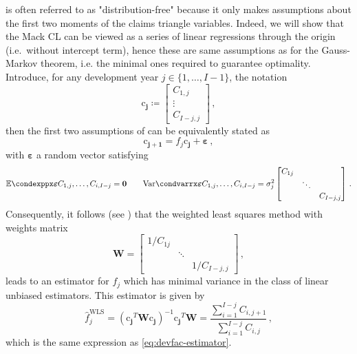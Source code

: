 \documentclass[a4paper]{book}
\begin{document}
 is often referred to as "distribution-free" because it only makes assumptions about the first two moments of the claims triangle variables. Indeed, we will show that the Mack CL can be viewed as a series of linear regressions through the origin (i.e.\ without intercept term), hence these are same assumptions as for the Gauss-Markov theorem, i.e. the minimal ones required to guarantee optimality. Introduce, for any development year $j \in \{ 1, \dots, {I - 1} \}$, the notation
\begin{equation}
  \bm{\mathrm{c}_j} \coloneqq
  \begin{bmatrix}
    C_{1, j} \\
    \vdots \\
    C_{I - j, j}
  \end{bmatrix} \,,
\end{equation}
then the first two assumptions of  can be equivalently stated as
\begin{equation}
  \bm{\mathrm{c}_{j + 1}} = f_j \bm{\mathrm{c}_j} + \bm{\varepsilon} \,,
\end{equation}
with $\bm{\varepsilon}$ a random vector satisfying
\begin{equation}
  \condexpp{\bm{\varepsilon}}{C_{1, j}, \dots, C_{i, I - j}} = \bm{0}
  \qquad%
  \condvarr{\bm{\varepsilon}}{C_{1, j}, \dots, C_{i, I - j}} = \sigma^2_j
  \begin{bmatrix}
    C_{1j} & & \\
    & \ddots & \\
    & & C_{I - j, j}
  \end{bmatrix} \,.
\end{equation}
Consequently, it follows (see \cite[Proposition 1.7]{hayashi}) that the weighted least squares method with weights matrix
\begin{equation}
  \mathbf{W} =
  \begin{bmatrix}
    1 / C_{1j} & & \\
    & \ddots & \\
    & & 1 / C_{I - j, j}
  \end{bmatrix} \,,
\end{equation}
leads to an estimator for $f_j$ which has minimal variance in the class of linear unbiased estimators. This estimator is given by
\begin{equation}
  \widehat{f}^{\mathrm{WLS}}_j = (\bm{\mathrm{c}_j}^T \mathbf{W} \bm{\mathrm{c}_j})^{-1} \bm{\mathrm{c}_j}^T \mathbf{W} = \frac{\sum_{i = 1}^{I - j} C_{i, j + 1}}{\sum_{i = 1}^{I - j} C_{i, j}} \,,
\end{equation}
which is the same expression as \cref{eq:devfac-estimator}.
\end{document}
